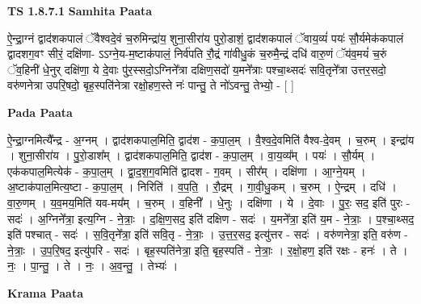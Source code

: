 \documentclass[17pt]{extarticle}
\begin{document}
\textbf{TS 1.8.7.1 } \newline
\textbf{Samhita Paata} \newline

ऐ॒न्द्रा॒ग्नं द्वाद॑शकपालं ॅवैश्वदे॒वं च॒रुमिन्द्रा॑य॒ शुना॒सीरा॑य पुरो॒डाशं॒ द्वाद॑शकपालं ॅवाय॒व्यं॑ पयः॑ सौ॒र्यमेक॑कपालं द्वादशग॒वꣳ सीरं॒ दक्षि॑णा- ऽऽग्ने॒य-म॒ष्टाक॑पालं॒ निर्व॑पति रौ॒द्रं गा॑वीधु॒कं च॒रुमै॒न्द्रं दधि॑ वारु॒णं ॅय॑व॒मयं॑ च॒रुं ॅव॒हिनी॑ धे॒नुर् दक्षि॑णा॒ ये दे॒वाः पु॑र॒स्सदो॒ऽग्निने᳚त्रा दक्षिण॒सदो॑ य॒मने᳚त्राः पश्चा॒थ्सदः॑ सवि॒तृने᳚त्रा उत्तर॒सदो॒ वरु॑णनेत्रा उपरि॒षदो॒ बृह॒स्पति॑नेत्रा रक्षो॒हण॒स्ते नः॑ पान्तु॒ ते नो॑ऽवन्तु॒ तेभ्यो॒ - [ ] \newline

\textbf{Pada Paata} \newline

ऐ॒न्द्रा॒ग्नमित्यै᳚न्द्र - अ॒ग्नम् । द्वाद॑शकपाल॒मिति॒ द्वाद॑श - क॒पा॒ल॒म् । वै॒श्व॒दे॒वमिति॑ वैश्व-दे॒वम् । च॒रुम् । इन्द्रा॑य । शुना॒सीरा॑य । पु॒रो॒डाश᳚म् । द्वाद॑शकपाल॒मिति॒ द्वाद॑श - क॒पा॒ल॒म् । वा॒य॒व्य᳚म् । पयः॑ । सौ॒र्यम् । एक॑कपाल॒मित्येक॑ - क॒पा॒ल॒म् । द्वा॒द॒श॒ग॒वमिति॑ द्वादश - ग॒वम् । सीर᳚म् । दक्षि॑णा । आ॒ग्ने॒यम् । अ॒ष्टाक॑पाल॒मित्य॒ष्टा - क॒पा॒ल॒म् । निरिति॑ । व॒प॒ति॒ । रौ॒द्रम् । गा॒वी॒धु॒कम् । च॒रुम् । ऐ॒न्द्रम् । दधि॑ । वा॒रु॒णम् । य॒व॒मय॒मिति॑ यव-मय᳚म् । च॒रुम् । व॒हिनी᳚ । धे॒नुः । दक्षि॑णा । ये । दे॒वाः । पु॒रः॒ सद॒ इति॑ पुरः - सदः॑ । अ॒ग्निने᳚त्रा॒ इत्य॒ग्नि - ने॒त्राः॒ । द॒क्षि॒ण॒सद॒ इति॑ दक्षिण - सदः॑ । य॒मने᳚त्रा॒ इति॑ य॒म - ने॒त्राः॒ । प॒श्चा॒थ्सद॒ इति॑ पश्चात् - सदः॑ । स॒वि॒तृने᳚त्रा॒ इति॑ सवि॒तृ - ने॒त्राः॒ । उ॒त्त॒र॒सद॒ इत्यु॑त्तर - सदः॑ । वरु॑णनेत्रा॒ इति॒ वरु॑ण - ने॒त्राः॒ । उ॒प॒रि॒षद॒ इत्यु॑परि - सदः॑ । बृह॒स्पति॑नेत्रा॒ इति॒ बृह॒स्पति॑ - ने॒त्राः॒ । र॒क्षो॒हण॒ इति॑ रक्षः - हनः॑ । ते । नः॒ । पा॒न्तु॒ । ते । नः॒ । अ॒व॒न्तु॒ । तेभ्यः॑ ।  \newline


\textbf{Krama Paata} \newline
\end{document}
